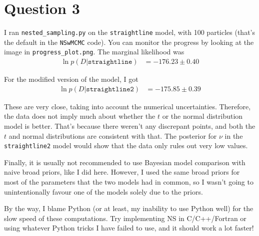 \documentclass[a4paper, 12pt]{article}
\begin{document}
\section*{Question 3}
I ran {\tt nested\_sampling.py} on the {\tt straightline} model, with 100 particles
(that's the default in the {\tt NSwMCMC} code). You can monitor the progress by
looking at the image in {\tt progress\_plot.png}.
The marginal likelihood was
\begin{align}
\ln p(D | \texttt{straightline}) &= -176.23 \pm 0.40
\end{align}

For the modified version of the model, I got
\begin{align}
\ln p(D | \texttt{straightline2}) &= -175.85 \pm 0.39
\end{align}

These are very close, taking into account the numerical uncertainties.
Therefore, the data does not imply much about whether the $t$ or the
normal distribution model is better.
That's because there weren't any discrepant points, and both the $t$
and normal distributions are consistent with that. The posterior
for $\nu$ in the {\tt straightline2} model would show that the data
only rules out very low values.

Finally, it is usually
not recommended to use Bayesian model comparison with
naive broad priors, like I did here. However, I used the same broad priors
for most of the parameters that the two models had in common, so I wasn't
going to unintentionally favour one of the models solely due to the priors.

By the way, I blame Python (or at least, my inability to use Python well) for
the slow speed of these computations. Try implementing NS in C/C++/Fortran or
using whatever Python tricks I have failed to use, and it should work a lot
faster!
\end{document}
